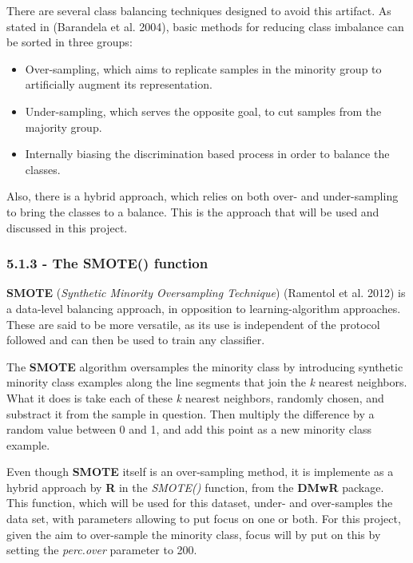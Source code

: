 \documentclass[]{article}
\begin{document}
There are several class balancing techniques designed to avoid this
artifact. As stated in (Barandela et al. 2004), basic methods for
reducing class imbalance can be sorted in three groups:

\begin{itemize}
\itemsep1pt\parskip0pt
\item
  Over-sampling, which aims to replicate samples in the minority group
  to artificially augment its representation.\\
\item
  Under-sampling, which serves the opposite goal, to cut samples from
  the majority group.\\
\item
  Internally biasing the discrimination based process in order to
  balance the classes.
\end{itemize}

Also, there is a hybrid approach, which relies on both over- and
under-sampling to bring the classes to a balance. This is the approach
that will be used and discussed in this project.

\subsubsection{5.1.3 - The SMOTE() function}\label{the-smote-function}

\textbf{SMOTE} (\emph{Synthetic Minority Oversampling Technique})
(Ramentol et al. 2012) is a data-level balancing approach, in opposition
to learning-algorithm approaches. These are said to be more versatile,
as its use is independent of the protocol followed and can then be used
to train any classifier.

The \textbf{SMOTE} algorithm oversamples the minority class by
introducing synthetic minority class examples along the line segments
that join the \emph{k} nearest neighbors. What it does is take each of
these \emph{k} nearest neighbors, randomly chosen, and substract it from
the sample in question. Then multiply the difference by a random value
between 0 and 1, and add this point as a new minority class example.

Even though \textbf{SMOTE} itself is an over-sampling method, it is
implemente as a hybrid approach by \textbf{R} in the \emph{SMOTE()}
function, from the \textbf{DMwR} package. This function, which will be
used for this dataset, under- and over-samples the data set, with
parameters allowing to put focus on one or both. For this project, given
the aim to over-sample the minority class, focus will by put on this by
setting the \emph{perc.over} parameter to 200.
\end{document}
